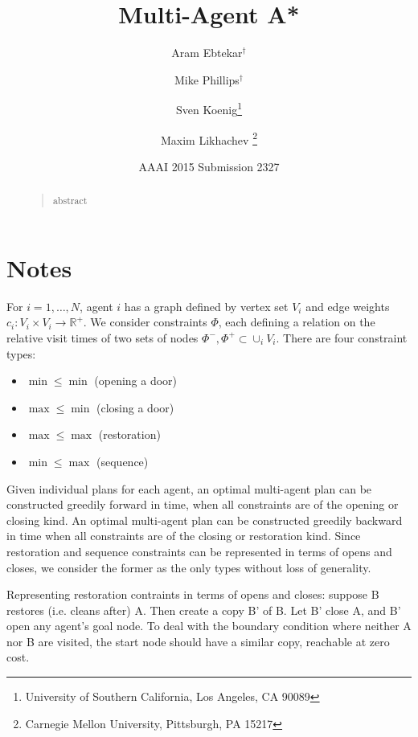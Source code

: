 \documentclass[letterpaper]{article}
\begin{document}
%
\title{Multi-Agent A*}
\author{Aram Ebtekar$^\dagger$ \and Mike Phillips$^\dagger$ \and Sven Koenig\thanks{University of Southern California, Los Angeles, CA 90089} \and Maxim Likhachev%
\thanks{Carnegie Mellon University, Pittsburgh, PA 15217}%
%
}
\author{AAAI 2015 Submission 2327}%
\maketitle
\begin{abstract}
\begin{quote}
abstract
\end{quote}
\end{abstract}

\section{Notes}

For $i=1,\ldots,N$, agent $i$ has a graph defined by vertex set $V_i$ and edge weights $c_i : V_i \times V_i \rightarrow \mathbb R^+$. We consider constraints $\Phi$, each defining a relation on the relative visit times of two sets of nodes $\Phi^-,\Phi^+\subset \cup_i V_i$. There are four constraint types:

\begin{itemize}
\item $\min \le \min$ (opening a door)
\item $\max \le \min$ (closing a door)
\item $\max \le \max$ (restoration)
\item $\min \le \max$ (sequence)
\end{itemize}

Given individual plans for each agent, an optimal multi-agent plan can be constructed greedily forward in time, when all constraints are of the opening or closing kind. An optimal multi-agent plan can be constructed greedily backward in time when all constraints are of the closing or restoration kind. Since restoration and sequence constraints can be represented in terms of opens and closes, we consider the former as the only types without loss of generality.

Representing restoration contraints in terms of opens and closes: suppose B restores (i.e. cleans after) A. Then create a copy B' of B. Let B' close A, and B' open any agent's goal node. To deal with the boundary condition where neither A nor B are visited, the start node should have a similar copy, reachable at zero cost.
\end{document}
